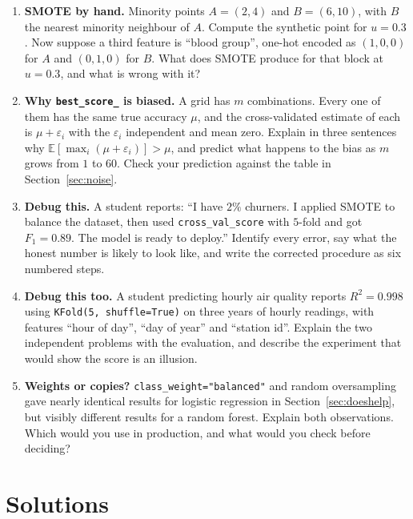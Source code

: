 \documentclass[11pt]{article}
\begin{document}
\begin{enumerate}[leftmargin=*]
  \item \textbf{SMOTE by hand.} Minority points $A = (2, 4)$ and
    $B = (6, 10)$, with $B$ the nearest minority neighbour of $A$. Compute the
    synthetic point for $u = 0.3$. Now suppose a third feature is
    ``blood group'', one-hot encoded as $(1,0,0)$ for $A$ and $(0,1,0)$ for
    $B$. What does SMOTE produce for that block at $u = 0.3$, and what is
    wrong with it?

  \item \textbf{Why \texttt{best\_score\_} is biased.} A grid has $m$
    combinations. Every one of them has the same true accuracy $\mu$, and the
    cross-validated estimate of each is $\mu + \varepsilon_i$ with the
    $\varepsilon_i$ independent and mean zero. Explain in three sentences why
    $\mathbb{E}[\max_i(\mu + \varepsilon_i)] > \mu$, and predict what happens
    to the bias as $m$ grows from $1$ to $60$. Check your prediction against
    the table in Section~\ref{sec:noise}.

  \item \textbf{Debug this.} A student reports: ``I have $2\%$ churners. I
    applied SMOTE to balance the dataset, then used \texttt{cross\_val\_score}
    with $5$-fold and got $F_1 = 0.89$. The model is ready to deploy.''
    Identify every error, say what the honest number is likely to look like,
    and write the corrected procedure as six numbered steps.

  \item \textbf{Debug this too.} A student predicting hourly air quality
    reports $R^2 = 0.998$ using \texttt{KFold(5, shuffle=True)} on three years
    of hourly readings, with features ``hour of day'', ``day of year'' and
    ``station id''. Explain the two independent problems with the evaluation,
    and describe the experiment that would show the score is an illusion.

  \item \textbf{Weights or copies?} \texttt{class\_weight="balanced"} and
    random oversampling gave nearly identical results for logistic regression
    in Section~\ref{sec:doeshelp}, but visibly different results for a random
    forest. Explain both observations. Which would you use in production, and
    what would you check before deciding?
\end{enumerate}

\section{Solutions}
\label{sec:solutions}
\end{document}
